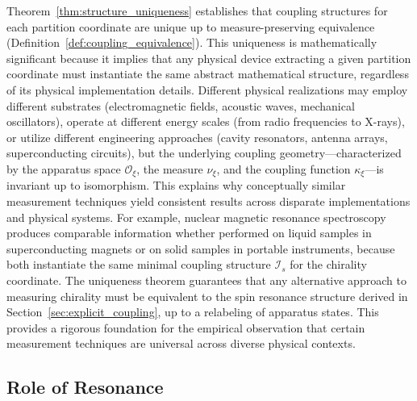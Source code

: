 \documentclass[twocolumn,10pt,a4paper]{article}
\theoremstyle{remark}
\newcommand{\oscillator}{\mathcal{O}}
\begin{document}
Theorem~\ref{thm:structure_uniqueness} establishes that coupling structures for each partition coordinate are unique up to measure-preserving equivalence (Definition~\ref{def:coupling_equivalence}). This uniqueness is mathematically significant because it implies that any physical device extracting a given partition coordinate must instantiate the same abstract mathematical structure, regardless of its physical implementation details. Different physical realizations may employ different substrates (electromagnetic fields, acoustic waves, mechanical oscillators), operate at different energy scales (from radio frequencies to X-rays), or utilize different engineering approaches (cavity resonators, antenna arrays, superconducting circuits), but the underlying coupling geometry—characterized by the apparatus space $\oscillator_\xi$, the measure $\nu_\xi$, and the coupling function $\kappa_\xi$—is invariant up to isomorphism. This explains why conceptually similar measurement techniques yield consistent results across disparate implementations and physical systems. For example, nuclear magnetic resonance spectroscopy produces comparable information whether performed on liquid samples in superconducting magnets or on solid samples in portable instruments, because both instantiate the same minimal coupling structure $\mathcal{I}_s$ for the chirality coordinate. The uniqueness theorem guarantees that any alternative approach to measuring chirality must be equivalent to the spin resonance structure derived in Section~\ref{sec:explicit_coupling}, up to a relabeling of apparatus states. This provides a rigorous foundation for the empirical observation that certain measurement techniques are universal across diverse physical contexts.

\subsection{Role of Resonance}
\end{document}
